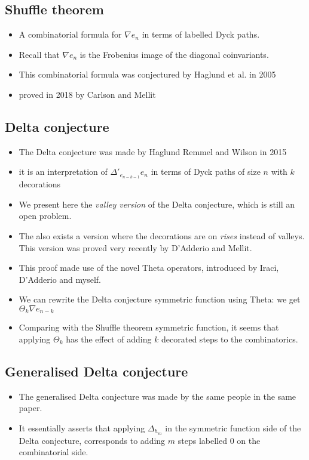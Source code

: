 \documentclass{article}
\begin{document}
\subsection{Shuffle theorem}
    \begin{itemize}
        \item A combinatorial formula for $\nabla e_n$ in terms of labelled Dyck paths.
        \item Recall that $\nabla e_n$ is the Frobenius image of the diagonal coinvariants.
        \item This combinatorial formula was conjectured by Haglund et al. in 2005
        \item proved in 2018 by Carlson and Mellit
    \end{itemize}

\subsection{Delta conjecture}
\begin{itemize}
    \item The Delta conjecture was made by Haglund Remmel and Wilson in 2015
    \item it is an interpretation of $\Delta'_{e_{n-k-1}}e_n$ in terms of Dyck paths of size $n$ with $k$ decorations
    \item We present here the \emph{valley version} of the Delta conjecture, which is still an open problem. 
    \item The also exists a version where the decorations are on \emph{rises} instead of valleys. This version was proved very recently by D'Adderio and Mellit. 
    \item This proof made use of the novel Theta operators, introduced by Iraci, D'Adderio and myself. 
    \item We can rewrite the Delta conjecture symmetric function using Theta: we get $\Theta_k \nabla e_{n-k}$
    \item Comparing with the Shuffle theorem symmetric function, it seems that applying $\Theta_k$ has the effect of adding $k$ decorated steps to the combinatorics.
\end{itemize}

\subsection{Generalised Delta conjecture}
\begin{itemize}
    \item The generalised Delta conjecture was made by the same people in the same paper.
    \item It essentially asserts that applying $\Delta_{h_m}$ in the symmetric function side of the Delta conjecture, corresponds to adding $m$ steps labelled $0$ on the combinatorial side. 
\end{itemize}
\end{document}
